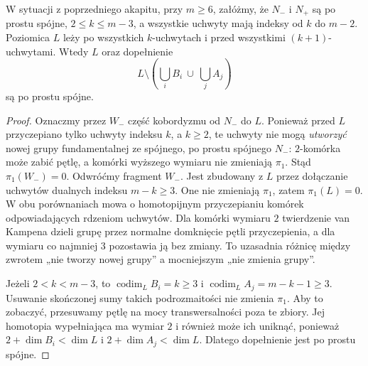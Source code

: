\begin{lemat}
\label{lem:komplement-whitney-19}
W sytuacji z poprzedniego akapitu, przy $m\geq6$,
załóżmy, że $N_-$ i $N_+$ są
po prostu spójne, $2\leq k\leq m-3$, a wszystkie uchwyty
mają indeksy od $k$ do $m-2$. Poziomica $L$ leży po wszystkich
$k$-uchwytach i przed wszystkimi $(k+1)$-uchwytami.
Wtedy $L$ oraz dopełnienie
\[
 L\setminus
   \left(\bigcup_i B_i\ \cup\ \bigcup_j A_j\right)
\]
są po prostu spójne.
\end{lemat}
\begin{proof}
Oznaczmy przez $W_-$ część
kobordyzmu od $N_-$ do $L$.
Ponieważ przed $L$ przyczepiano
tylko uchwyty indeksu $k$,
a $k\geq2$, te uchwyty nie mogą
\emph{utworzyć} nowej grupy
fundamentalnej ze spójnego,
po prostu spójnego $N_-$:
$2$-komórka może zabić pętlę,
a komórki wyższego wymiaru
nie zmieniają $\pi_1$.
Stąd $\pi_1(W_-)=0$.
Odwróćmy fragment $W_-$.
Jest zbudowany z $L$
przez dołączanie uchwytów
dualnych indeksu $m-k\geq3$.
One nie zmieniają $\pi_1$,
zatem $\pi_1(L)=0$.
W obu porównaniach mowa o homotopijnym przyczepianiu komórek
odpowiadających rdzeniom uchwytów. Dla komórki wymiaru $2$
twierdzenie van Kampena dzieli grupę przez normalne domknięcie
pętli przyczepienia, a dla wymiaru co najmniej $3$ pozostawia
ją bez zmiany. To uzasadnia różnicę między zwrotem
„nie tworzy nowej grupy” a mocniejszym „nie zmienia grupy”.

Jeżeli $2<k<m-3$, to
$\operatorname{codim}_L B_i=k\geq3$
i $\operatorname{codim}_L A_j
=m-k-1\geq3$.
Usuwanie skończonej sumy
takich podrozmaitości nie
zmienia $\pi_1$.
Aby to zobaczyć, przesuwamy
pętlę na mocy transwersalności
poza te zbiory.
Jej homotopia wypełniająca
ma wymiar $2$ i również
może ich uniknąć, ponieważ
$2+\dim B_i<\dim L$
i $2+\dim A_j<\dim L$.
Dlatego dopełnienie jest
po prostu spójne.


\end{proof}
